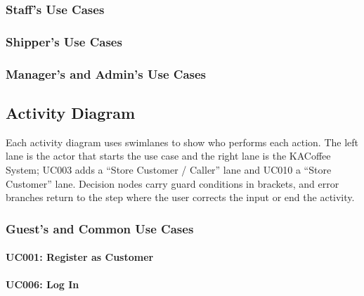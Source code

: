 

\subsubsection{Staff's Use Cases}





\subsubsection{Shipper's Use Cases}



\subsubsection{Manager's and Admin's Use Cases}




\clearpage
\subsection{Activity Diagram}\label{sec:activity}

Each activity diagram uses swimlanes to show who performs each action. The left lane is the actor that starts the use case and the right lane is the KACoffee System; UC003 adds a ``Store Customer / Caller'' lane and UC010 a ``Store Customer'' lane. Decision nodes carry guard conditions in brackets, and error branches return to the step where the user corrects the input or end the activity.

\subsubsection{Guest's and Common Use Cases}

\paragraph{UC001: Register as Customer}

\clearpage
\paragraph{UC006: Log In}

